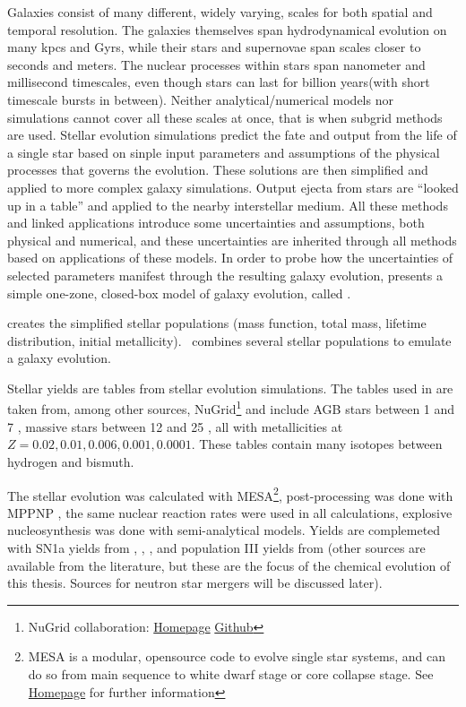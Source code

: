 Galaxies consist of many different, widely varying, scales for both spatial and temporal resolution.
The galaxies themselves span hydrodynamical evolution on many kpcs and Gyrs, while their stars and supernovae span scales closer to seconds and meters.
The nuclear processes within stars span nanometer and millisecond timescales, even though stars can last for billion years(with short timescale bursts in between).
Neither analytical/numerical models nor simulations cannot cover all these scales at once, that is when subgrid methods are used. Stellar evolution simulations predict the fate and output from the life of a single star based on sinple input parameters and assumptions of the physical processes that governs the evolution. These solutions are then simplified and applied to more complex galaxy simulations.
Output ejecta from stars are ``looked up in a table'' and applied to the nearby interstellar medium.
All these methods and linked applications introduce some uncertainties and assumptions, both physical and numerical, and these uncertainties are inherited through all methods based on applications of these models. In order to probe how the uncertainties of selected parameters manifest through the resulting galaxy evolution,  presents a simple one-zone, closed-box model of galaxy evolution, called \omegamodel.

\sygma creates the simplified stellar populations (mass function, total mass, lifetime distribution, initial metallicity).
\omegamodel\ combines several stellar populations to emulate a galaxy evolution.

Stellar yields are tables from stellar evolution simulations.
The tables used in \omegamodel are taken from, among other sources,  NuGrid\footnote{NuGrid collaboration: \href{http://www.astro.keele.ac.uk/nugrid/}{Homepage} \href{https://github.com/nugrid}{Github}} and include AGB stars between 1 and 7 \msol, massive stars between 12 and 25 \msol, all with metallicities at $Z = 0.02, 0.01, 0.006, 0.001, 0.0001$. These tables contain many isotopes between hydrogen and bismuth.

The stellar evolution was calculated with MESA\footnote{MESA is a modular, opensource code to evolve single star systems, and can do so from main sequence to white dwarf stage or core collapse stage. See \href{http://mesa.sourceforge.net}{Homepage} for further information}, post-processing was done with MPPNP , the same nuclear reaction rates were used in all calculations, explosive nucleosynthesis was done with semi-analytical models. Yields are complemeted with SN1a yields from , , ,  and population III yields from  (other sources are available from the literature, but these are the focus of the chemical evolution of this thesis. Sources for neutron star mergers will be discussed later).

